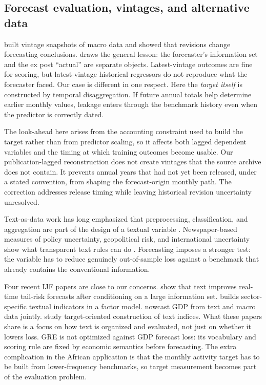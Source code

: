 \documentclass[preprint,12pt,authoryear]{elsarticle}
\begin{document}
\subsection{Forecast evaluation, vintages, and alternative data}

\citet{croushorestark2001} built vintage snapshots of macro data and showed
that revisions change forecasting conclusions. \citet{croushore2006} draws the
general lesson: the forecaster's information set and the ex post ``actual'' are
separate objects. Latest-vintage outcomes are fine for scoring, but
latest-vintage historical regressors do not reproduce what the forecaster
faced. Our case is different in one respect. Here the \emph{target itself} is
constructed by temporal disaggregation. If future annual totals help determine
earlier monthly values, leakage enters through the benchmark history even when
the predictor is correctly dated.

The look-ahead here arises from the accounting constraint used to build the
target rather than from predictor scaling, so it affects both lagged dependent
variables and the timing at which training outcomes become usable. Our
publication-lagged reconstruction does not create vintages that the source
archive does not contain. It prevents annual years that had not yet been
released, under a stated convention, from shaping the forecast-origin monthly
path. The correction addresses release timing while leaving historical revision
uncertainty unresolved.

Text-as-data work has long emphasized that preprocessing, classification, and
aggregation are part of the design of a textual variable
\citep{gentzkow2019}. Newspaper-based measures of policy uncertainty,
geopolitical risk, and international uncertainty show what transparent text
rules can do \citep{baker2016,caldara2022,ahir2022}. Forecasting imposes a
stronger test: the variable has to reduce genuinely out-of-sample loss against
a benchmark that already contains the conventional information.

Four recent IJF papers are close to our concerns. \citet{adaemmer2025} show
that text improves real-time tail-risk forecasts after conditioning on a large
information set. \citet{seo2025} builds sector-specific textual indicators in a
factor model. \citet{zheng2024} nowcast GDP from text and macro data jointly.
\citet{ardia2026} study target-oriented construction of text indices. What
these papers share is a focus on how text is organized and evaluated, not just
on whether it lowers loss. GRE is not optimized against GDP forecast loss: its
vocabulary and scoring rule are fixed by economic semantics before forecasting.
The extra complication in the African application is that the monthly activity
target has to be built from lower-frequency benchmarks, so target measurement
becomes part of the evaluation problem.
\end{document}
